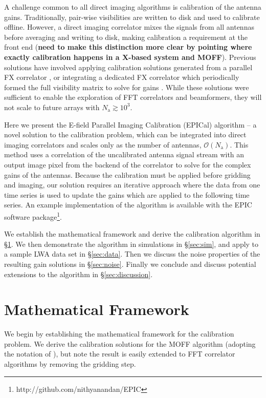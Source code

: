\documentclass[a4paper,fleqn,usenatbib]{../mnras}
\newcommand{\Nant}{\ensuremath{N_{\mathrm{a}}}}
\begin{document}
A challenge common to all direct imaging algorithms is calibration of the antenna gains. Traditionally, pair-wise visibilities are written to disk and used to calibrate offline. However, a direct imaging correlator mixes the signals from all antennas before averaging and writing to disk, making calibration a requirement at the front end ({\bf need to make this distinction more clear by pointing where exactly calibration happens in a X-based system and MOFF}). Previous solutions have involved applying calibration solutions generated from a parallel FX correlator \citep{zhe14, fos14}, or integrating a dedicated FX correlator which periodically formed the full visibility matrix to solve for gains \citep{wij09,dev09}. While these solutions were sufficient to enable the exploration of FFT correlators and beamformers, they will not scale to future arrays with $\Nant \gtrsim 10^3$.

Here we present the E-field Parallel Imaging Calibration (EPICal) algorithm -- a novel solution to the calibration problem, which can be integrated into direct imaging correlators and scales only as the number of antennas, $\mathcal{O}(\Nant)$. This method uses a correlation of the uncalibrated antenna signal stream with an output image pixel from the backend of the correlator to solve for the complex gains of the antennas. Because the calibration must be applied before gridding and imaging, our solution requires an iterative approach where the data from one time series is used to update the gains which are applied to the following time series. An example implementation of the algorithm is available with the EPIC software package\footnote{http://github.com/nithyanandan/EPIC}.

We establish the mathematical framework and derive the calibration algorithm in \S \ref{sec:math}. We then demonstrate the algorithm in simulations in \S \ref{sec:sim}, and apply to a sample LWA data set in \S \ref{sec:data}. Then we discuss the noise properties of the resulting gain solutions in \S \ref{sec:noise}. Finally we conclude and discuss potential extensions to the algorithm in \S \ref{sec:discussion}.

\section{Mathematical Framework}\label{sec:math}
We begin by establishing the mathematical framework for the calibration problem. We derive the calibration solutions for the MOFF algorithm (adopting the notation of \citealt{thy15c}), but note the result is easily extended to FFT correlator algorithms by removing the gridding step.
\end{document}

